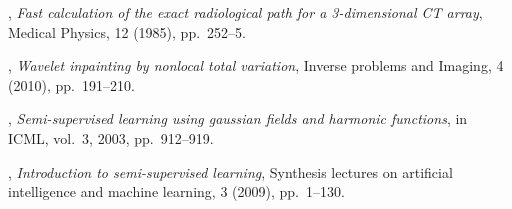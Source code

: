 \documentclass[letterpaper,10pt]{article}
\begin{document}
\begin{thebibliography}{10}
, {\em Fast calculation of the exact radiological path for a
  3-dimensional {CT} array}, Medical Physics, 12 (1985), pp.~252--5.

, {\em Wavelet inpainting by nonlocal total
  variation}, Inverse problems and Imaging, 4 (2010), pp.~191--210.

, {\em Semi-supervised learning
  using gaussian fields and harmonic functions}, in ICML, vol.~3, 2003,
  pp.~912--919.

, {\em Introduction to semi-supervised
  learning}, Synthesis lectures on artificial intelligence and machine
  learning, 3 (2009), pp.~1--130.

\end{thebibliography}
\end{document}
